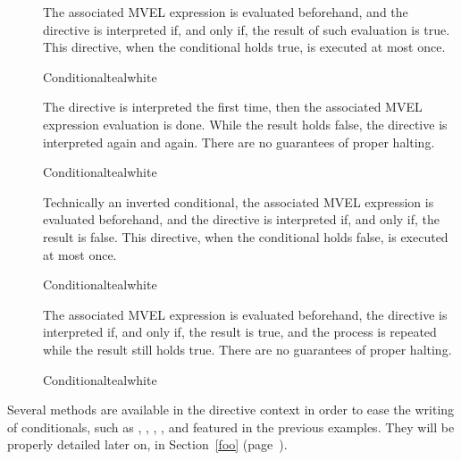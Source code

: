 \begin{description}
\item[] The associated MVEL expression is evaluated beforehand, and the directive is interpreted if, and only if, the result of such evaluation is true. This directive, when the conditional holds true, is executed at most once.

\begin{codebox}{Conditional}{teal}{\icnote}{white}
\end{codebox}

\item[] The directive is interpreted the first time, then the associated MVEL expression evaluation is done. While the result holds false, the directive is interpreted again and again. There are no guarantees of proper halting.

\begin{codebox}{Conditional}{teal}{\icnote}{white}
\end{codebox}

\item[] Technically an inverted  conditional, the associated MVEL expression is evaluated beforehand, and the directive is interpreted if, and only if, the result is false. This directive, when the conditional holds false, is executed at most once.

\begin{codebox}{Conditional}{teal}{\icnote}{white}
\end{codebox}

\item[] The associated MVEL expression is evaluated beforehand, the directive is interpreted if, and only if, the result is true, and the process is repeated while the result still holds true. There are no guarantees of proper halting.

\begin{codebox}{Conditional}{teal}{\icnote}{white}
\end{codebox}
\end{description}

Several methods are available in the directive context in order to ease the writing of conditionals, such as , , , , and  featured in the previous examples. They will be properly detailed later on, in Section~\ref{foo} (page~\pageref{foo}).

